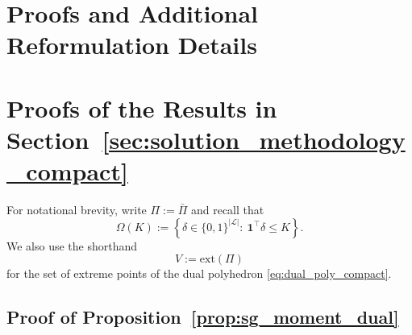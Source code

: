 


\section{Proofs and Additional Reformulation Details}
\label{app:sg_proofs}
\section{Proofs of the Results in Section~\ref{sec:solution_methodology_compact}}
\label{app:sg_proofs}

For notational brevity, write $\Pi:=\bar\Pi$ and recall that
\[
\Omega(K):=\left\{\delta\in\{0,1\}^{|\mathcal L|}:\ \mathbf 1^\top\delta\le K\right\}.
\]
We also use the shorthand
\[
V:=\mathrm{ext}(\Pi)
\]
for the set of extreme points of the dual polyhedron \eqref{eq:dual_poly_compact}.

\subsection{Proof of Proposition~\ref{prop:sg_moment_dual}}


